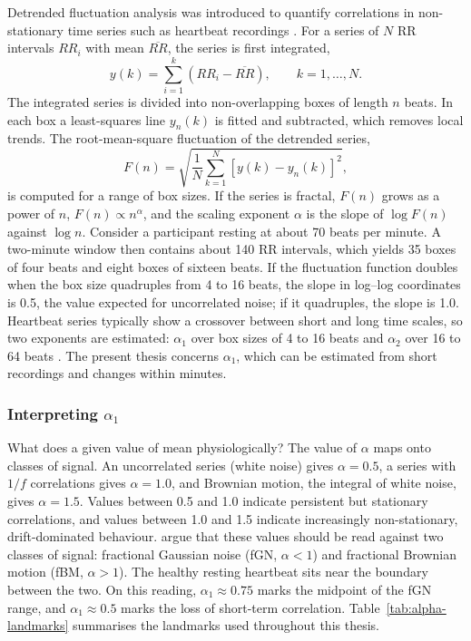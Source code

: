 Detrended fluctuation analysis was introduced to quantify correlations in non-stationary time series such as heartbeat recordings \citep{peng1995}. For a series of $N$ RR intervals $RR_i$ with mean $\overline{RR}$, the series is first integrated,
\begin{equation}
y(k) = \sum_{i=1}^{k} \left( RR_i - \overline{RR} \right), \qquad k = 1, \dots, N.
\end{equation}
The integrated series is divided into non-overlapping boxes of length $n$ beats. In each box a least-squares line $y_n(k)$ is fitted and subtracted, which removes local trends. The root-mean-square fluctuation of the detrended series,
\begin{equation}
F(n) = \sqrt{\frac{1}{N} \sum_{k=1}^{N} \left[ y(k) - y_n(k) \right]^2},
\end{equation}
is computed for a range of box sizes. If the series is fractal, $F(n)$ grows as a power of $n$, $F(n) \propto n^{\alpha}$, and the scaling exponent $\alpha$ is the slope of $\log F(n)$ against $\log n$. Consider a participant resting at about 70 beats per minute. A two-minute window then contains about 140 RR intervals, which yields 35 boxes of four beats and eight boxes of sixteen beats. If the fluctuation function doubles when the box size quadruples from 4 to 16 beats, the slope in log--log coordinates is 0.5, the value expected for uncorrelated noise; if it quadruples, the slope is 1.0. Heartbeat series typically show a crossover between short and long time scales, so two exponents are estimated: $\alpha_1$ over box sizes of 4 to 16 beats and $\alpha_2$ over 16 to 64 beats \citep{peng1995}. The present thesis concerns $\alpha_1$, which can be estimated from short recordings and changes within minutes.

\subsubsection{Interpreting $\alpha_1$}

What does a given value of \al{} mean physiologically? The value of $\alpha$ maps onto classes of signal. An uncorrelated series (white noise) gives $\alpha = 0.5$, a series with $1/f$ correlations gives $\alpha = 1.0$, and Brownian motion, the integral of white noise, gives $\alpha = 1.5$. Values between 0.5 and 1.0 indicate persistent but stationary correlations, and values between 1.0 and 1.5 indicate increasingly non-stationary, drift-dominated behaviour. \citet{hoos2025} argue that these values should be read against two classes of signal: fractional Gaussian noise (fGN, $\alpha < 1$) and fractional Brownian motion (fBM, $\alpha > 1$). The healthy resting heartbeat sits near the boundary between the two. On this reading, $\alpha_1 \approx 0.75$ marks the midpoint of the fGN range, and $\alpha_1 \approx 0.5$ marks the loss of short-term correlation. Table~\ref{tab:alpha-landmarks} summarises the landmarks used throughout this thesis.


